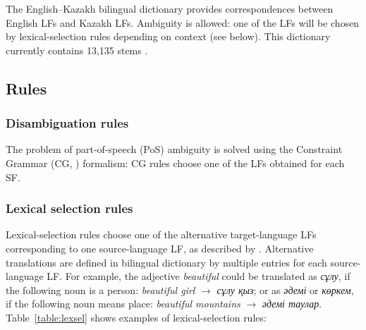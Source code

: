 \documentclass[11pt]{article}
\begin{document}
The English--Kazakh bilingual dictionary provides correspondences between English LFs and Kazakh LFs. Ambiguity is allowed: one of the LFs will be chosen by 
lexical-selection rules depending on context (see below). This dictionary currently contains 13,135 stems \citep{sundetova13a}.

\subsection{Rules}

\subsubsection{Disambiguation rules}

The problem of part-of-speech (PoS) ambiguity is solved using the  Constraint Grammar (CG, \cite{karlsson95}) formalism: CG rules choose one of the LFs obtained for each SF. %

\subsubsection{Lexical selection rules }

Lexical-selection rules choose one of the alternative target-language LFs corresponding to one source-language LF, as described by \cite{tyers12a}. Alternative translations are defined in bilingual dictionary by 
multiple entries for each source-language LF. For example, the adjective \emph{beautiful} could be translated as \emph{сұлу}, if 
the following noun is a person: \emph{beautiful girl} \(\to\) \emph{сұлу қыз}; or as \emph{әдемі} or  \emph{көркем}, if the following noun means 
place: \emph{beautiful mountains} \(\to\) \emph{әдемі таулар}.  Table~\ref{table:lexsel} shows examples of 
lexical-selection rules:
\end{document}
